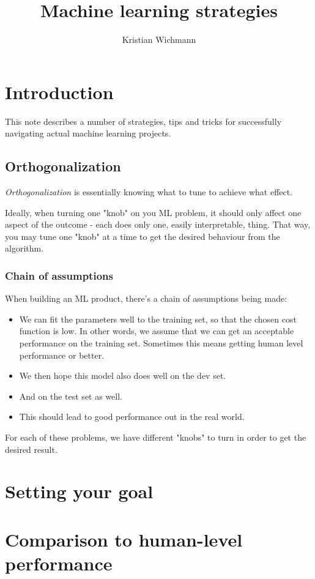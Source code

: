 \documentclass[12pt, a4paper]{article}
\title{Machine learning strategies}
\author{Kristian Wichmann}
\numberwithin{equation}{section}
\begin{document}
\maketitle

\section{Introduction}
This note describes a number of strategies, tips and tricks for successfully navigating actual machine learning projects.

\subsection{Orthogonalization}
\textit{Orthogonalization} is essentially knowing what to tune to achieve what effect.

Ideally, when turning one "knob" on you ML problem, it should only affect one aspect of the outcome - each does only one, easily interpretable, thing. That way, you may tune one "knob" at a time to get the desired behaviour from the algorithm.

\subsubsection{Chain of assumptions}
When building an ML product, there's a chain of assumptions being made:
\begin{itemize}
\item We can fit the parameters well to the training set, so that the chosen cost function is low. In other words, we assume that we can get an acceptable performance on the training set. Sometimes this means getting human level performance or better.
\item We then hope this model also does well on the dev set.
\item And on the test set as well.
\item This should lead to good performance out in the real world.
\end{itemize}
For each of these problems, we have different "knobs" to turn in order to get the desired result.

\section{Setting your goal}


\section{Comparison to human-level performance}
\end{document}
